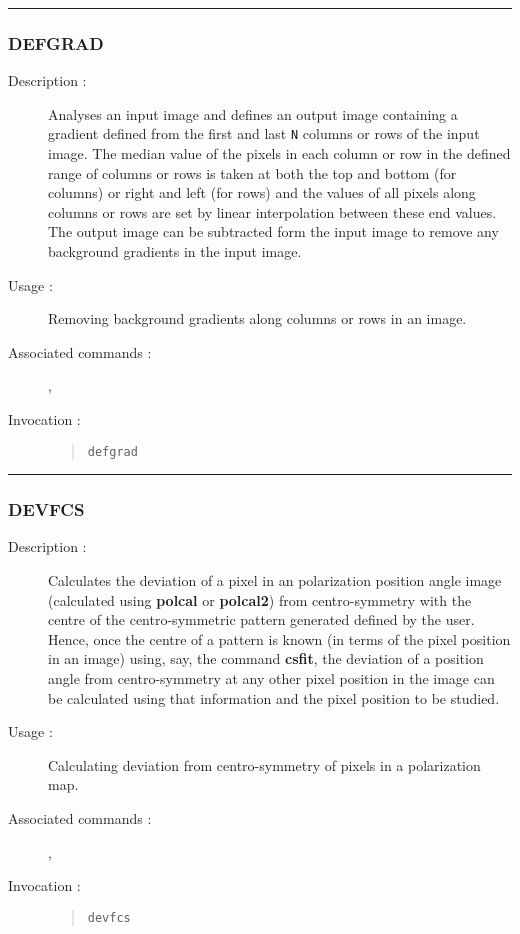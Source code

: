 \hrule
\subsubsection*{\label{DEFGRAD}DEFGRAD}

\begin{description}

\item[Description :] Analyses an input image and defines an output
image containing a gradient defined from the first and last {\tt N}
columns or rows of the input image.  The median value of the pixels in
each column or row in the defined range of columns or rows is taken at
both the top and bottom (for columns) or right and left (for rows) and
the values of all pixels along columns or rows are set by linear
interpolation between these end values. The output image can be
subtracted form the input image to remove any background gradients in
the input image.

\item[Usage :] Removing background gradients along columns or rows in an image.

\item[Associated commands :] {\tt {}},
{\tt {}}

\item[Invocation :]

\begin{quote}{\tt  defgrad }\end{quote}

\end{description}

\hrule
\subsubsection*{\label{DEVFCS}DEVFCS}

\begin{description}

\item[Description :] Calculates the deviation of a pixel in an
polarization position angle image (calculated using {\bf polcal} or
{\bf polcal2}) from centro-symmetry with the centre of the
centro-symmetric pattern generated defined by the user.  Hence, once
the centre of a pattern is known (in terms of the pixel position in an
image) using, say, the command {\bf csfit}, the deviation of a position
angle from centro-symmetry at any other pixel position in the image can
be calculated using that information and the pixel position to be
studied.

\item[Usage :] Calculating deviation from centro-symmetry of pixels in a
polarization map.

\item[Associated commands :] {\tt {}},
{\tt {}}

\item[Invocation :]

\begin{quote}{\tt  devfcs }\end{quote}

\end{description}

